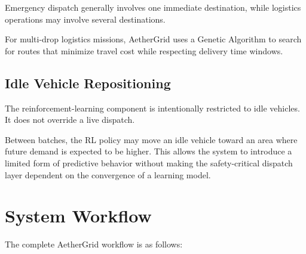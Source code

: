 \documentclass[12pt,a4paper]{article}
\begin{document}
Emergency dispatch generally involves one immediate destination,
while logistics operations may involve several destinations.

For multi-drop logistics missions, AetherGrid uses a Genetic
Algorithm to search for routes that minimize travel cost while
respecting delivery time windows.

\subsection{Idle Vehicle Repositioning}

The reinforcement-learning component is intentionally restricted to
idle vehicles. It does not override a live dispatch.

Between batches, the RL policy may move an idle vehicle toward an
area where future demand is expected to be higher. This allows the
system to introduce a limited form of predictive behavior without
making the safety-critical dispatch layer dependent on the
convergence of a learning model.





\section{System Workflow}

The complete AetherGrid workflow is as follows:
\end{document}

